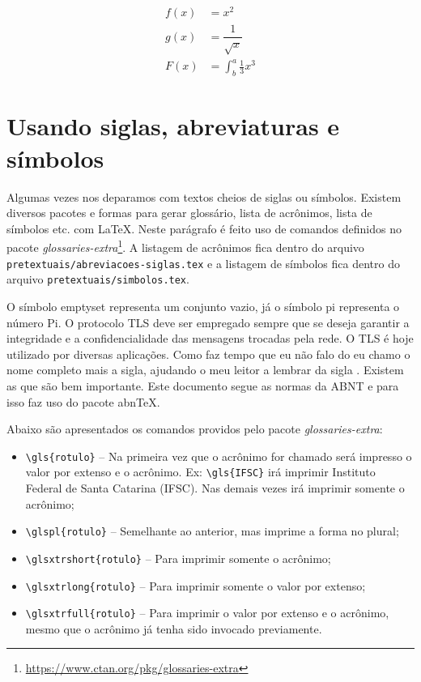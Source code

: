 \begin{align}
f(x) &= x^2 \nonumber\\
g(x) &= \dfrac{1}{\sqrt{x}} \nonumber\\
F(x) &= \int^a_b \frac{1}{3}x^3
\label{e_c2_eq2}
\end{align}


\section{Usando siglas, abreviaturas e símbolos}

Algumas vezes nos deparamos com textos cheios de siglas ou símbolos. Existem diversos pacotes e formas para gerar glossário, lista de acrônimos, lista de símbolos etc. com \LaTeX. Neste parágrafo é feito uso de comandos definidos no pacote \textit{glossaries-extra}\footnote{\url{https://www.ctan.org/pkg/glossaries-extra}}. A listagem de acrônimos fica dentro do arquivo \texttt{pretextuais/abreviacoes-siglas.tex} e a listagem de símbolos fica dentro do arquivo \texttt{pretextuais/simbolos.tex}.

O símbolo \gls{emptyset} representa um conjunto vazio, já o símbolo \gls{pi} representa o número Pi. O protocolo \gls{TLS} deve ser empregado sempre que se deseja garantir a integridade e a confidencialidade das mensagens trocadas pela rede. O \gls{TLS} é hoje utilizado por diversas aplicações. Como faz tempo que eu não falo do  eu chamo o nome completo mais a sigla, ajudando o meu leitor a lembrar da sigla . Existem as  que são bem importante. Este documento segue as normas da \gls{ABNT} e para isso faz uso do pacote \gls{abnTeX}.

Abaixo são apresentados os comandos providos pelo pacote \textit{glossaries-extra}:

\begin{itemize}
    \item \verb+\gls{rotulo}+ -- Na primeira vez que o acrônimo for chamado será impresso o valor por extenso e o acrônimo. Ex: \verb+\gls{IFSC}+ irá imprimir Instituto Federal de Santa Catarina (IFSC). Nas demais vezes irá imprimir somente o acrônimo;
    \item \verb+\glspl{rotulo}+ -- Semelhante ao anterior, mas imprime a forma no plural;
    \item \verb+\glsxtrshort{rotulo}+ -- Para imprimir somente o acrônimo;
    \item \verb+\glsxtrlong{rotulo}+ -- Para imprimir somente o valor por extenso;
    \item \verb+\glsxtrfull{rotulo}+ -- Para imprimir o valor por extenso e o acrônimo, mesmo que o acrônimo já tenha sido invocado previamente.
\end{itemize}



